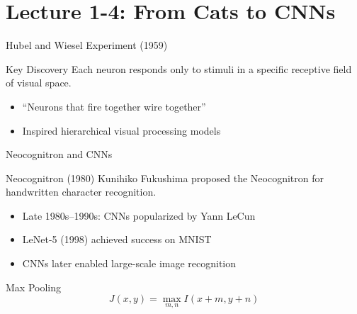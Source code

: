\documentclass{beamer}
\begin{document}
\section{Lecture 1-4: From Cats to CNNs}

\begin{frame}{Hubel and Wiesel Experiment (1959)}

\begin{block}{Key Discovery}
Each neuron responds only to stimuli in a specific receptive field of visual space.
\end{block}

\vspace{0.2cm}

\begin{itemize}
\item ``Neurons that fire together wire together''
\item Inspired hierarchical visual processing models
\end{itemize}

\end{frame}


\begin{frame}{Neocognitron and CNNs}

\begin{block}{Neocognitron (1980)}
Kunihiko Fukushima proposed the Neocognitron for handwritten character recognition.
\end{block}

\vspace{0.2cm}

\begin{itemize}
\item Late 1980s--1990s: CNNs popularized by Yann LeCun
\item LeNet-5 (1998) achieved success on MNIST
\item CNNs later enabled large-scale image recognition
\end{itemize}

\vspace{0.2cm}

\begin{exampleblock}{Max Pooling}
\[
J(x,y)=\max_{m,n} I(x+m,y+n)
\]
\end{exampleblock}

\end{frame}
\end{document}
